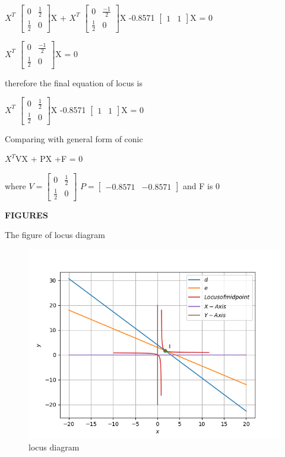\documentclass{beamer}
\begin{document}
\begin{frame}

$X^{T}$
$\begin{bmatrix}
 0 & \frac{1}{2} \\
 \frac{1}{2} & 0 
\end{bmatrix}$X +
$X^{T}$
$\begin{bmatrix}
 0 & \frac{-1}{2} \\
 \frac{1}{2} & 0 
\end{bmatrix}$X 
-0.8571
$\begin{bmatrix}
 1 & 1 
\end{bmatrix}$X = 0

$X^{T}$
$\begin{bmatrix}
 0 & \frac{-1}{2} \\
 \frac{1}{2} & 0 
\end{bmatrix}$X  = 0

 therefore the final equation of locus is 
 
 $X^{T}$
$\begin{bmatrix}
 0 & \frac{1}{2} \\
 \frac{1}{2} & 0 
\end{bmatrix}$X  
-0.8571
$\begin{bmatrix}
 1 & 1 
\end{bmatrix}$X = 0

Comparing with general form of conic 

$X^{T}$VX + PX +F = 0

where 
$ V=
\begin{bmatrix}
 0 & \frac{1}{2}\\
 \frac{1}{2} & 0
\end{bmatrix}
$ 
$ P=
\begin{bmatrix}
 -0.8571 & -0.8571
\end{bmatrix}
$ 
 and F is 0
\end{frame}
\begin{frame}
\textbf{FIGURES}


The figure of locus diagram
\begin{figure}
\includegraphics[scale=0.5]{locus}
\caption{locus diagram}
\end{figure}

\end{frame}
\end{document}
